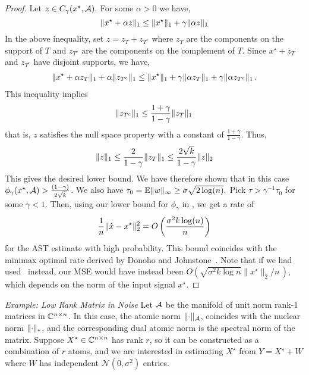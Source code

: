 \begin{proof}
Let $z \in C_\gamma(x^\star,\mathcal{A}).$ For some $\alpha>0$ we have,
\[
\lVert x^\star + \alpha z\rVert_1 \leq \lVert x^\star\rVert_1 + \gamma \lVert\alpha z\rVert_1
\]
In the above inequality, set $z = z_T + z_{T^c}$ where $z_T$ are the components on the support of $T$ and $z_{T^c} $ are the components on the complement of $T$. Since $x^\star + z_T$ and $z_{T^c}$ have disjoint supports, we have,
\begin{align*}
\lVert x^\star + \alpha z_T\rVert_1 + \alpha \lVert z_{T^c}\rVert_1 \leq \lVert x^\star\rVert_1 + \gamma \lVert\alpha z_T\rVert_1 + \gamma \lVert\alpha z_{T^c}\rVert_1\,.
\end{align*}
This inequality  implies
\begin{align*}
 \lVert z_{T^c}\rVert_1 \leq \frac{1+\gamma}{1-\gamma} \lVert z_T\rVert_1\,
\end{align*}
that is, $z$ satisfies the null space property with a constant of $\tfrac{1+\gamma}{1-\gamma}.$ Thus,
\[
\lVert z\rVert_1 \leq \frac{2}{1-\gamma}\lVert z_T\rVert_1 \leq \frac{2\sqrt{k}}{1-\gamma}\lVert z\rVert_2
\]
This gives the desired lower bound. We have therefore shown that in this case $\phi_\gamma(x^\star,\mathcal{A})
>\frac{(1-\gamma)}{2\sqrt{k}}$. We also have $\tau_0 = \operatorname{\mathbb{E}} \lVert w\rVert_\infty \geq
\sigma\sqrt{2\log(n)}.$ Pick $\tau > \gamma^{-1} \tau_0$ for some $\gamma < 1.$
Then, using our lower bound for $\phi_\gamma$ in , we get a
rate of
\begin{align}\label{eq:sparse-fast-rate}
\frac{1}{n}\lVert\hat{x}-x^\star\rVert_2^2 = O\left(\frac{\sigma^2 k\log(n)}{n}\right)
\end{align}
for the AST estimate with high probability. This bound coincides with
the minimax optimal rate derived by Donoho and Johnstone~\cite{Donoho94}. Note
that if we had used~ instead, our MSE would have
instead been $O\left(\sqrt{\sigma^2 k\log n}\|x^\star\|_2/n\,
\right)$, which depends on the norm of the input signal $x^\star$.
\end{proof}

\emph{Example: Low Rank Matrix in Noise}
Let $\mathcal{A}$ be the manifold of unit norm rank-$1$ matrices in $\mathbb{C}^{n\times n}$. In
this case, the atomic norm $\lVert\cdot\rVert_{\mathcal{A}}$, coincides with the nuclear norm
$\lVert\cdot\rVert_*$, and the corresponding dual atomic norm is the spectral norm
of the matrix. Suppose $X^\star \in \mathbb{C}^{n\times n}$ has rank $r$, so it can be
constructed as a combination of $r$ atoms, and we are interested in estimating
$X^\star$ from $Y = X^\star + W$ where $W$ has independent
$\mathcal{N}(0,\sigma^2)$ entries.

